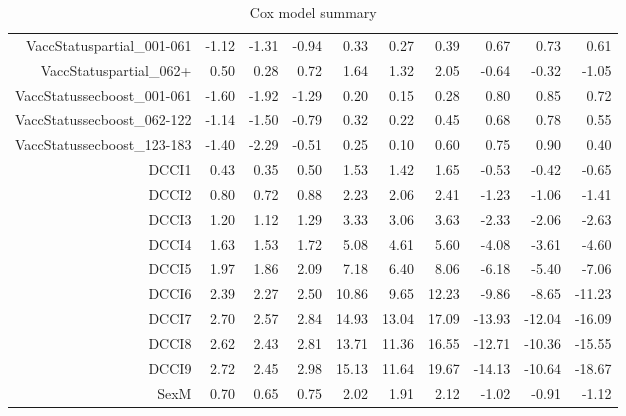 \begin{table}[ht]
\begin{tabular}{rrrrrrrrrr}
  VaccStatuspartial\_001-061 & -1.12 & -1.31 & -0.94 & 0.33 & 0.27 & 0.39 & 0.67 & 0.73 & 0.61 \\ 
  VaccStatuspartial\_062+ & 0.50 & 0.28 & 0.72 & 1.64 & 1.32 & 2.05 & -0.64 & -0.32 & -1.05 \\ 
  VaccStatussecboost\_001-061 & -1.60 & -1.92 & -1.29 & 0.20 & 0.15 & 0.28 & 0.80 & 0.85 & 0.72 \\ 
  VaccStatussecboost\_062-122 & -1.14 & -1.50 & -0.79 & 0.32 & 0.22 & 0.45 & 0.68 & 0.78 & 0.55 \\ 
  VaccStatussecboost\_123-183 & -1.40 & -2.29 & -0.51 & 0.25 & 0.10 & 0.60 & 0.75 & 0.90 & 0.40 \\ 
  DCCI1 & 0.43 & 0.35 & 0.50 & 1.53 & 1.42 & 1.65 & -0.53 & -0.42 & -0.65 \\ 
  DCCI2 & 0.80 & 0.72 & 0.88 & 2.23 & 2.06 & 2.41 & -1.23 & -1.06 & -1.41 \\ 
  DCCI3 & 1.20 & 1.12 & 1.29 & 3.33 & 3.06 & 3.63 & -2.33 & -2.06 & -2.63 \\ 
  DCCI4 & 1.63 & 1.53 & 1.72 & 5.08 & 4.61 & 5.60 & -4.08 & -3.61 & -4.60 \\ 
  DCCI5 & 1.97 & 1.86 & 2.09 & 7.18 & 6.40 & 8.06 & -6.18 & -5.40 & -7.06 \\ 
  DCCI6 & 2.39 & 2.27 & 2.50 & 10.86 & 9.65 & 12.23 & -9.86 & -8.65 & -11.23 \\ 
  DCCI7 & 2.70 & 2.57 & 2.84 & 14.93 & 13.04 & 17.09 & -13.93 & -12.04 & -16.09 \\ 
  DCCI8 & 2.62 & 2.43 & 2.81 & 13.71 & 11.36 & 16.55 & -12.71 & -10.36 & -15.55 \\ 
  DCCI9 & 2.72 & 2.45 & 2.98 & 15.13 & 11.64 & 19.67 & -14.13 & -10.64 & -18.67 \\ 
  SexM & 0.70 & 0.65 & 0.75 & 2.02 & 1.91 & 2.12 & -1.02 & -0.91 & -1.12 \\ 
   \hline
\end{tabular}
\caption{Cox model summary} 
\end{table}
